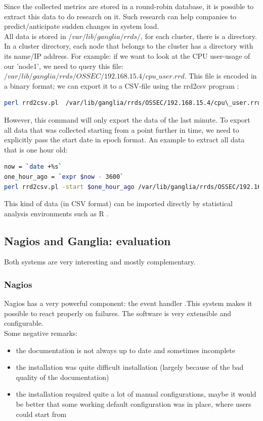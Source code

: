 \documentclass[12pt]{report}
\begin{document}
Since the collected metrics are stored in a round-robin database, it is possible to
extract this data to do research on it. Such research can help
companies to predict/anticipate sudden changes in system load.\\

All data is stored in $/var/lib/ganglia/rrds/$, for each cluster,
there is a directory. In a cluster directory, each node that belongs
to the cluster has a directory with its name/IP address.
For example: if we want to look at the CPU user-usage of our 'node1',
we need to query this file:
$/var/lib/ganglia/rrds/OSSEC/192.168.15.4/cpu\_user.rrd$. This file is
encoded in a binary format; we can export it to a CSV-file using the
rrd2csv program \cite{rrd2csv}:
\begin{lstlisting}[language=bash]
perl rrd2csv.pl  /var/lib/ganglia/rrds/OSSEC/192.168.15.4/cpu\_user.rrd > node1_cpu_user.csv
\end{lstlisting} 

However, this command will only export the data of the last minute. To
export all data that was collected starting from a point further in time, we need to
explicitly pass the start date in epoch format.
An example to extract all data that is one hour old:
\begin{lstlisting}[language=bash]
now = `date +%s`
one_hour_ago = `expr $now - 3600` 
perl rrd2csv.pl -start $one_hour_ago /var/lib/ganglia/rrds/OSSEC/192.168.15.4/cpu\_user.rrd > node1_cpu_user.csv
\end{lstlisting} 

This kind of data (in CSV format) can be imported directly by statistical analysis
environments such as R \cite{r_software}.

\subsection{Nagios and Ganglia: evaluation}
Both systems are very interesting and mostly complementary.
\subsubsection{Nagios}
Nagios has a very powerful component: the event handler .This system makes it
possible to react properly on failures. The software is very
extensible and configurable.\\
Some negative remarks: 
\begin{itemize}
\item the documentation is not always up to date and sometimes incomplete
\item the installation was quite difficult installation (largely
  because of the bad quality of the documentation)
\item the installation required quite a lot of manual configurations,
  maybe it would be better that some working default configuration was
  in place, where users could start from
\end{itemize}
\end{document}
